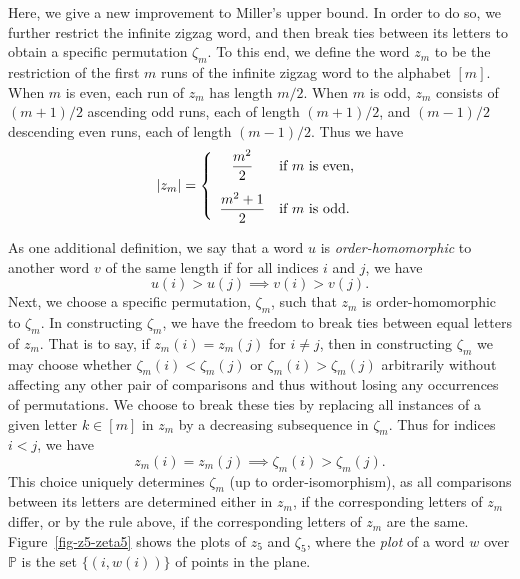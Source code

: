 Here, we give a new improvement to Miller's upper bound. In order to do so, we further restrict the infinite zigzag word, and then break ties between its letters to obtain a specific permutation $\zeta_m$. To this end, we define the word $z_m$ to be the restriction of the first $m$ runs of the infinite zigzag word to the alphabet $[m]$. When $m$ is even, each run of $z_m$ has length $m/2$. When $m$ is odd, $z_m$ consists of $(m+1)/2$ ascending odd runs, each of length $(m+1)/2$, and $(m-1)/2$ descending even runs, each of length $(m-1)/2$. Thus we have
\[
	\left\lvert{z_m}\right\rvert
	=
	\left\{
	\begin{array}{cl}
		\displaystyle\frac{m^2}{2}  &\text{if $m$ is even,}\\[12pt]
		\displaystyle\frac{m^2+1}{2}&\text{if $m$ is odd.}
	\end{array}
	\right.
\]

As one additional definition, we say that a word $u$ is \emph{order-homomorphic} to another word $v$ of the same length if for all indices $i$ and $j$, we have
\[
	u(i) > u(j)
	\implies
	v(i) > v(j).
\]
Next, we choose a specific permutation, $\zeta_m$, such that $z_m$ is order-homomorphic to $\zeta_m$. In constructing $\zeta_m$, we have the freedom to break ties between equal letters of $z_m$. That is to say, if $z_m(i)=z_m(j)$ for $i\neq j$, then in constructing $\zeta_m$ we may choose whether $\zeta_m(i)<\zeta_m(j)$ or $\zeta_m(i)>\zeta_m(j)$ arbitrarily without affecting any other pair of comparisons and thus without losing any occurrences of permutations. We choose to break these ties by replacing all instances of a given letter $k\in[m]$ in $z_m$ by a decreasing subsequence in $\zeta_m$. Thus for indices $i<j$, we have
\[
	z_m(i)=z_m(j)
	\implies
	\zeta_m(i)>\zeta_m(j).
\]
This choice uniquely determines $\zeta_m$ (up to order-isomorphism), as all comparisons between its letters are determined either in $z_m$, if the corresponding letters of $z_m$ differ, or by the rule above, if the corresponding letters of $z_m$ are the same. Figure~\ref{fig-z5-zeta5} shows the plots of $z_5$ and $\zeta_5$, where the \emph{plot} of a word $w$ over $\mathbb{P}$ is the set $\{(i,w(i))\}$ of points in the plane.

